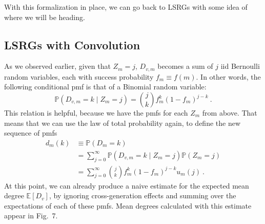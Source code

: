 \documentclass[12pt]{article}
\newcommand{\E}{\mathbb{E}}
\renewcommand{\P}{\mathbb{P}}
\begin{document}
With this formalization in place, we can go back to LSRGs with some idea
of where we will be heading.

\subsection{\textbf{\textsf{LSRGs with Convolution}}}

As we observed earlier, given that $Z_m=j$, $D_{v, m}$ becomes a sum of
$j$ iid Bernoulli random variables, each with success probability $f_m\equiv f(m)$.
In other words, the following conditional pmf is that of a Binomial random
variable: \[ \P(D_{v,m} = k \mid Z_m = j) = {j \choose k} f_m^k(1-f_m)^{j-k}\ .\]
This relation is helpful, because we have the pmfs for each $Z_m$ from above.
That means that we can use the law of total probability again, to define the
new sequence of pmfs
\begin{align*}
d_m(k) &\equiv \P(D_m=k) \\
       &= \sum_{j=0}^\infty \P(D_{v,m}=k \mid Z_m = j)\P(Z_m=j)\\
       &= \sum_{j=0}^\infty {j \choose k} f_m^k(1-f_m)^{j-k} u_m(j)\ .
\end{align*}
At this point, we can already produce a naive estimate for the expected mean
degree $\E[D_v]$, by ignoring cross-generation effects and summing
over the expectations of each of these pmfs. Mean degrees calculated
with this estimate appear in Fig.~7.\par
\end{document}
